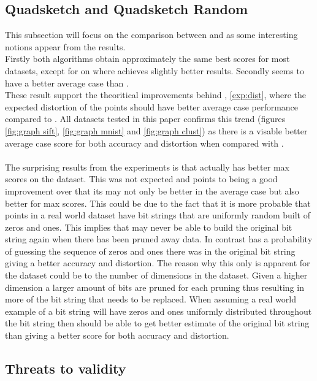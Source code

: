 \subsection{Quadsketch and Quadsketch Random}
This subsection will focus on the comparison between \qs{} and \qsr{} as some interesting notions appear from the results. 
\\
Firstly both algorithms obtain approximately the same best scores for most datasets, except for on \mnist{} where \qsr{} achieves slightly better results. 
Secondly \qsr{} seems to have a better average case than \qs{}. 
\\
These result support the theoritical improvements behind \qsr{}, \ref{exp:dist}, where the expected distortion of the points should have better average case performance compared to \qs{}. All datasets tested in this paper confirms this trend (figures \ref{fig:graph sift}, \ref{fig:graph mnist} and \ref{fig:graph clust}) as there is a visable better average case score for both accuracy and distortion when compared with \qs{}.
\\
\\
The surprising results from the experiments is that \qsr{} actually has better max scores on the \mnist dataset. This was not expected and points to \qsr{} being a good improvement over \qs{} that its may not only be better in the average case but also better for max scores. This could be due to the fact that it is more probable that points in a real world dataset have bit strings that are uniformly random built of zeros and ones. This implies that \qs{} may never be able to build the original bit string again when there has been pruned away data. In contrast \qsr{} has a probability of guessing the sequence of zeros and ones there was in the original bit string giving a better accuracy and distortion. The reason why this only is apparent for the \mnist{} dataset could be to the number of dimensions in the dataset. Given a higher dimension a larger amount of bits are pruned for each pruning thus resulting in more of the bit string that needs to be replaced. When assuming a real world example of a bit string will have zeros and ones uniformly distributed throughout the bit string then \qsr{} should be able to get better estimate of the original bit string than \qs{} giving a better score for both accuracy and distortion. 



\subsection{Threats to validity}

